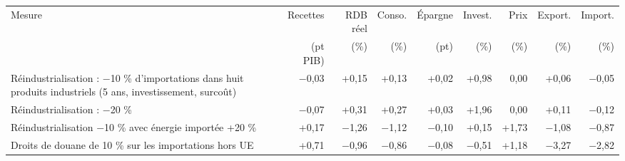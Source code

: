 \begin{tabular}{p{5.0cm}rrrrrrrr}
\toprule
Mesure & Recettes & RDB réel & Conso. & Épargne & Invest. & Prix & Export. & Import. \\
 & (pt PIB) & (\%) & (\%) & (pt) & (\%) & (\%) & (\%) & (\%) \\
\midrule
Réindustrialisation : −10 \% d'importations dans huit produits industriels (5 ans, investissement, surcoût) & $-$0{,}03 & +0{,}15 & +0{,}13 & +0{,}02 & +0{,}98 & 0{,}00 & +0{,}06 & $-$0{,}05 \\
Réindustrialisation : −20 \% & $-$0{,}07 & +0{,}31 & +0{,}27 & +0{,}03 & +1{,}96 & 0{,}00 & +0{,}11 & $-$0{,}12 \\
Réindustrialisation −10 \% avec énergie importée +20 \% & +0{,}17 & $-$1{,}26 & $-$1{,}12 & $-$0{,}10 & +0{,}15 & +1{,}73 & $-$1{,}08 & $-$0{,}87 \\
Droits de douane de 10 \% sur les importations hors UE & +0{,}71 & $-$0{,}96 & $-$0{,}86 & $-$0{,}08 & $-$0{,}51 & +1{,}18 & $-$3{,}27 & $-$2{,}82 \\
\bottomrule
\end{tabular}
